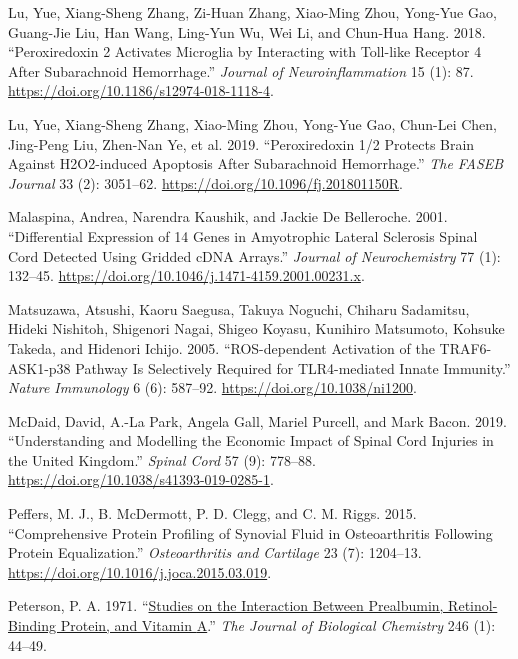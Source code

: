 \documentclass[9pt,lineno]{elife}
\newlength{\cslhangindent}
\newlength{\cslentryspacingunit} %
\newenvironment{CSLReferences}[2] %
 {%
  \setlength{\parindent}{0pt}
  \ifodd #1
  \let\oldpar\par
  \def\par{\hangindent=\cslhangindent\oldpar}
  \fi
  \setlength{\parskip}{#2\cslentryspacingunit}
 }%
 {}
\begin{document}
\begin{landscape}
\begin{landscape}
\begin{landscape}
\begin{landscape}
\begin{CSLReferences}{1}{0}
\leavevmode{}%
Lu, Yue, Xiang-Sheng Zhang, Zi-Huan Zhang, Xiao-Ming Zhou, Yong-Yue Gao, Guang-Jie Liu, Han Wang, Ling-Yun Wu, Wei Li, and Chun-Hua Hang. 2018. {``Peroxiredoxin 2 Activates Microglia by Interacting with {Toll-like} Receptor 4 After Subarachnoid Hemorrhage.''} \emph{Journal of Neuroinflammation} 15 (1): 87. \url{https://doi.org/10.1186/s12974-018-1118-4}.

\leavevmode{}%
Lu, Yue, Xiang-Sheng Zhang, Xiao-Ming Zhou, Yong-Yue Gao, Chun-Lei Chen, Jing-Peng Liu, Zhen-Nan Ye, et al. 2019. {``Peroxiredoxin 1/2 Protects Brain Against {H2O2-induced} Apoptosis After Subarachnoid Hemorrhage.''} \emph{The FASEB Journal} 33 (2): 3051--62. \url{https://doi.org/10.1096/fj.201801150R}.

\leavevmode{}%
Malaspina, Andrea, Narendra Kaushik, and Jackie De Belleroche. 2001. {``Differential Expression of 14 Genes in Amyotrophic Lateral Sclerosis Spinal Cord Detected Using Gridded {cDNA} Arrays.''} \emph{Journal of Neurochemistry} 77 (1): 132--45. \url{https://doi.org/10.1046/j.1471-4159.2001.00231.x}.

\leavevmode{}%
Matsuzawa, Atsushi, Kaoru Saegusa, Takuya Noguchi, Chiharu Sadamitsu, Hideki Nishitoh, Shigenori Nagai, Shigeo Koyasu, Kunihiro Matsumoto, Kohsuke Takeda, and Hidenori Ichijo. 2005. {``{ROS-dependent} Activation of the {TRAF6-ASK1-p38} Pathway Is Selectively Required for {TLR4-mediated} Innate Immunity.''} \emph{Nature Immunology} 6 (6): 587--92. \url{https://doi.org/10.1038/ni1200}.

\leavevmode{}%
McDaid, David, A.-La Park, Angela Gall, Mariel Purcell, and Mark Bacon. 2019. {``Understanding and Modelling the Economic Impact of Spinal Cord Injuries in the {United Kingdom}.''} \emph{Spinal Cord} 57 (9): 778--88. \url{https://doi.org/10.1038/s41393-019-0285-1}.

\leavevmode{}%
Peffers, M. J., B. McDermott, P. D. Clegg, and C. M. Riggs. 2015. {``Comprehensive Protein Profiling of Synovial Fluid in Osteoarthritis Following Protein Equalization.''} \emph{Osteoarthritis and Cartilage} 23 (7): 1204--13. \url{https://doi.org/10.1016/j.joca.2015.03.019}.

\leavevmode{}%
Peterson, P. A. 1971. {``\href{https://www.ncbi.nlm.nih.gov/pubmed/5541771}{Studies on the Interaction Between Prealbumin, Retinol-Binding Protein, and Vitamin {A}}.''} \emph{The Journal of Biological Chemistry} 246 (1): 44--49.


\end{CSLReferences}
\end{landscape}
\end{landscape}
\end{landscape}
\end{landscape}
\end{document}
